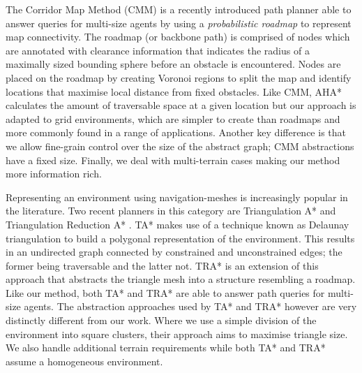 \indent The Corridor Map Method (CMM) \cite{geraerts07} is a recently introduced path planner able to answer queries for multi-size agents by using a \emph{probabilistic roadmap} to represent map connectivity. 
The roadmap (or backbone path) is comprised of nodes which are annotated with clearance information that indicates the radius of a maximally sized bounding sphere before an obstacle is encountered. 
Nodes are placed on the roadmap by creating Voronoi regions to split the map and identify locations that maximise local distance from fixed obstacles. 
Like CMM, AHA* calculates the amount of traversable space at a given location but our approach is adapted to grid environments, which are simpler to create than roadmaps and more commonly found in a range of applications. 
Another key difference is that we allow fine-grain control over the size of the abstract graph; CMM abstractions have a fixed size.
Finally, we deal with multi-terrain cases making our method more information rich. 
\par \indent 
Representing an environment using navigation-meshes is increasingly popular in the literature. 
Two recent planners in this category are Triangulation A* and Triangulation Reduction A* \cite{demyen07}. 
TA* makes use of a technique known as Delaunay triangulation to build a polygonal representation of the environment. 
This results in an undirected graph connected by constrained and unconstrained edges; the former being traversable and the latter not. 
TRA* is an extension of this approach that abstracts the triangle mesh into a structure resembling a roadmap. 
Like our method, both TA* and TRA* are able to answer path queries for multi-size agents. 
The abstraction approaches used by TA* and TRA* however are very distinctly different from our work. 
Where we use a simple division of the environment into square clusters, their approach aims to maximise triangle size. 
We also handle additional terrain requirements while both TA* and TRA* assume a homogeneous environment.

